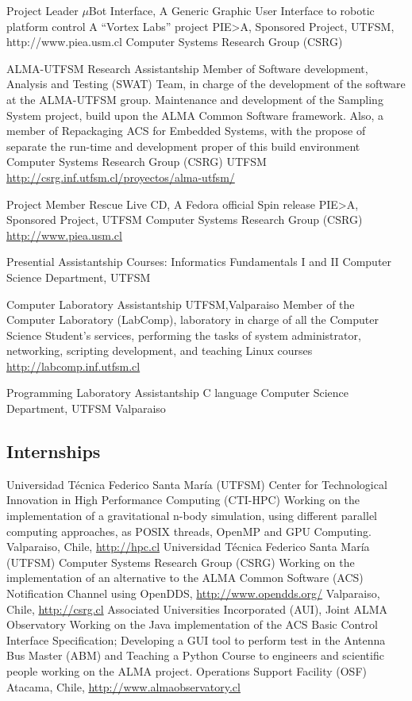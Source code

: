 \documentclass[11pt,a4paper]{moderncv}
\begin{document}
	{Project Leader}
	{$\mu$Bot Interface, A Generic Graphic User Interface to robotic platform control}
	{A ``Vortex Labs'' project}
	{PIE>A, Sponsored Project, UTFSM, http://www.piea.usm.cl}
	{Computer Systems Research Group (CSRG)}

	{ALMA-UTFSM Research Assistantship}
	{Member of Software development, Analysis and Testing (SWAT) Team, in charge of the development of the software at the ALMA-UTFSM group. 
	Maintenance and development of the Sampling System project, build upon the ALMA Common Software framework.
	Also, a member of Repackaging ACS for Embedded Systems, with the propose of separate the run-time and development
	proper of this build environment}
	{Computer Systems Research Group (CSRG)}
	{UTFSM}
    {\url{http://csrg.inf.utfsm.cl/proyectos/alma-utfsm/}}

	{Project Member}
	{Rescue Live CD, A Fedora official Spin release}
	{PIE>A, Sponsored Project, UTFSM}
	{Computer Systems Research Group (CSRG)}
	{\url{http://www.piea.usm.cl}}

	{Presential Assistantship}
	{Courses: Informatics Fundamentals  I and II}
	{Computer Science Department, UTFSM}
	{}{}

	{Computer Laboratory Assistantship}
	{UTFSM,Valparaiso}
	{Member of the Computer Laboratory (LabComp), laboratory in charge of all the Computer Science Student's services, performing the tasks of system administrator, networking, scripting development, and teaching Linux courses}
	{\url{http://labcomp.inf.utfsm.cl}}{}

	{Programming Laboratory Assistantship}
	{C language}
	{Computer Science Department, UTFSM}
	{Valparaiso}
	{}

\subsection{Internships}

	{Universidad Técnica Federico Santa María (UTFSM)}
	{Center for Technological Innovation in High Performance Computing (CTI-HPC)}
	{Working on the implementation of a gravitational n-body simulation, using different parallel computing approaches, as POSIX threads, OpenMP and GPU Computing.}
	{Valparaiso, Chile, \url{http://hpc.cl}}
	{Universidad Técnica Federico Santa María (UTFSM)}
	{Computer Systems Research Group (CSRG)}
	{Working on the implementation of an alternative to the ALMA Common Software (ACS) Notification Channel using OpenDDS, \url{http://www.opendds.org/}}
	{Valparaiso, Chile, \url{http://csrg.cl}}
	{Associated Universities Incorporated (AUI), Joint ALMA Observatory}
	{Working on the Java implementation of the ACS Basic Control Interface Specification; Developing a GUI tool to perform test in the Antenna Bus Master (ABM) and Teaching a Python Course to engineers and scientific people working on the ALMA project.}
	{Operations Support Facility (OSF)}
	{Atacama, Chile, \url{http://www.almaobservatory.cl}}
\end{document}
